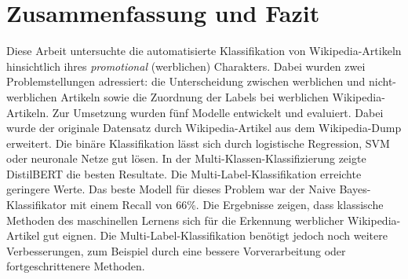 \section{Zusammenfassung und Fazit}
\label{ZusammenfassungUndFazit}
Diese Arbeit untersuchte die automatisierte Klassifikation von Wikipedia-Artikeln hinsichtlich ihres \textit{promotional} (werblichen) Charakters. Dabei wurden zwei Problemstellungen adressiert: die Unterscheidung zwischen werblichen und nicht-werblichen Artikeln sowie die Zuordnung der Labels bei werblichen Wikipedia-Artikeln. Zur Umsetzung wurden fünf Modelle entwickelt und evaluiert. Dabei wurde der originale Datensatz durch Wikipedia-Artikel aus dem Wikipedia-Dump erweitert. Die binäre Klassifikation lässt sich durch logistische Regression, SVM oder neuronale Netze gut lösen. In der Multi-Klassen-Klassifizierung zeigte DistilBERT die besten Resultate. Die Multi-Label-Klassifikation erreichte geringere Werte. Das beste Modell für dieses Problem war der Naive Bayes-Klassifikator mit einem Recall von 66\%. Die Ergebnisse zeigen, dass klassische Methoden des maschinellen Lernens sich für die Erkennung werblicher Wikipedia-Artikel gut eignen. Die Multi-Label-Klassifikation benötigt jedoch noch weitere Verbesserungen, zum Beispiel durch eine bessere Vorverarbeitung oder fortgeschrittenere Methoden.
